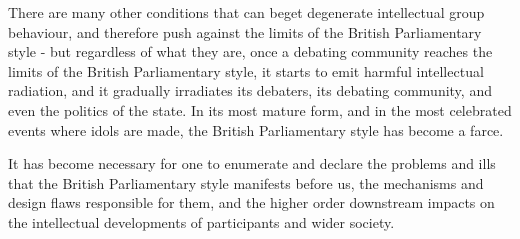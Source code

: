 There are many other conditions that can beget degenerate intellectual group behaviour, and therefore push against the limits of the British Parliamentary style - but regardless of what they are, once a debating community reaches the limits of the British Parliamentary style, it starts to emit harmful intellectual radiation, and it gradually irradiates its debaters, its debating community, and even the politics of the state. In its most mature form, and in the most celebrated events where idols are made, the British Parliamentary style has become a farce.

It has become necessary for one to enumerate and declare the problems and ills that the British Parliamentary style manifests before us, the mechanisms and design flaws responsible for them, and the higher order downstream impacts on the intellectual developments of participants and wider society.

